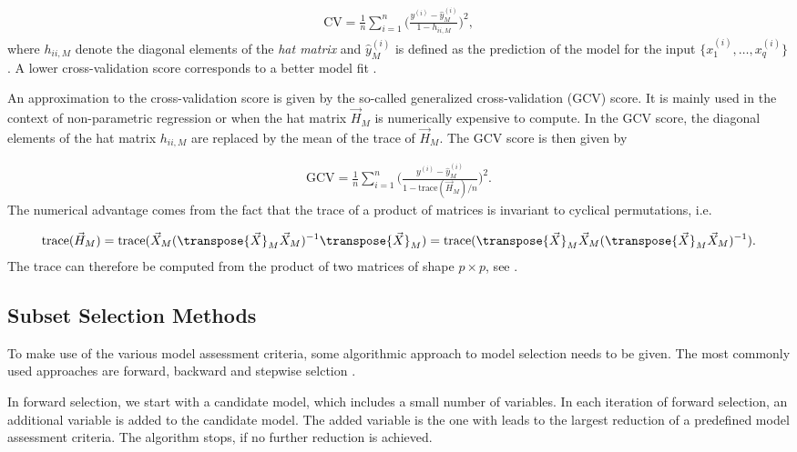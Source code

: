 \begin{align} \label{eq:cross-validation}
	\text{CV} = \frac{1}{n} \sum_{i=1}^n \Big( \frac{y^{(i)} - \hat y^{(i)}_M}{1 - h_{ii,M}} \Big)^2,
\end{align}
%
where $h_{ii,M}$ denote the diagonal elements of the \emph{hat matrix} and $\hat y^{(i)}_M$ is defined as the prediction of the model for the input $\{x^{(i)}_1, \dots, x^{(i)}_q \}$. A lower cross-validation score corresponds to a better model fit \cite{golub1979}.

An approximation to the cross-validation score is given by the so-called generalized cross-validation (GCV) score. It is mainly used in the context of non-parametric regression or when the hat matrix $\vec{H}_M$ is numerically expensive to compute. In the GCV score, the diagonal elements of the hat matrix $h_{ii,M}$ are replaced by the mean of the trace of $\vec{H}_M$. The GCV score is then given by

\begin{align} \label{eq:generalizied-cross-validation}
	\text{GCV} = \frac{1}{n}\sum_{i=1}^n \Big( \frac{y^{(i)} - \hat y^{(i)}_M}{1 - \text{trace}(\vec{H}_M)/n}\Big)^2.
\end{align}
%
The numerical advantage comes from the fact that the trace of a product of matrices is invariant to cyclical permutations, i.e.

\begin{align}
	\text{trace}(\vec{H}_M) = \text{trace}(\vec{X}_M(\transpose{\vec{X}}_M \vec{X}_M)^{-1} \transpose{\vec{X}}_M) =\text{trace}(\transpose{\vec{X}}_M \vec{X}_M (\transpose{\vec{X}}_M \vec{X}_M)^{-1}).
\end{align} 
%
The trace can therefore be computed from the product of two matrices of shape $p\times p$, see  \cite{fahrmeir2007regression}.

\subsection{Subset Selection Methods} \label{subsec:SSM}

To make use of the various model assessment criteria, some algorithmic approach to model selection needs to be given. The most commonly used approaches are forward, backward and stepwise selction \cite{fahrmeir2007regression}. 

In forward selection, we start with a candidate model, which includes a small number of variables. In each iteration of forward selection, an additional variable is added to the candidate model.  The added variable is the one with leads to the largest reduction of a predefined model assessment criteria. The algorithm stops, if no further reduction is achieved.

